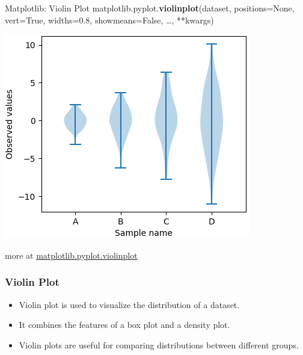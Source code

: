 \documentclass{beamer}
\begin{document}
    \begin{frame}[fragile]{Matplotlib: Violin Plot}
        matplotlib.pyplot.\textbf{violinplot}(dataset, positions=None, vert=True, widths=0.8, showmeans=False, \dots, **kwargs)\\
        \begin{center}
            \includegraphics[width=\textwidth,height=0.6\textheight,keepaspectratio]{figures/violinplot.png}\\
        \end{center}
        more at \href{https://matplotlib.org/stable/api/_as_gen/matplotlib.pyplot.violinplot.html}{matplotlib.pyplot.violinplot}
    \end{frame}
    \begin{frame}
        \frametitle{Violin Plot}
        \begin{itemize}
            \item Violin plot is used to visualize the distribution of a dataset.
            \item It combines the features of a box plot and a density plot.
            \item Violin plots are useful for comparing distributions between different groups.
        \end{itemize}
    \end{frame}
\end{document}
